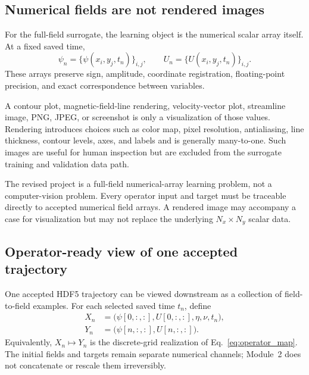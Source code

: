 \documentclass[11pt]{article}
\begin{document}
\subsection{Numerical fields are not rendered images}

For the full-field surrogate, the learning object is the numerical scalar array itself. At a fixed saved time,
\begin{equation}
\psi_n=\{\psi(x_i,y_j,t_n)\}_{i,j},
\qquad
U_n=\{U(x_i,y_j,t_n)\}_{i,j}.
\end{equation}
These arrays preserve sign, amplitude, coordinate registration, floating-point precision, and exact correspondence between variables.

A contour plot, magnetic-field-line rendering, velocity-vector plot, streamline image, PNG, JPEG, or screenshot is only a visualization of those values. Rendering introduces choices such as color map, pixel resolution, antialiasing, line thickness, contour levels, axes, and labels and is generally many-to-one. Such images are useful for human inspection but are excluded from the surrogate training and validation data path.

\begin{warningbox}
The revised project is a full-field numerical-array learning problem, not a computer-vision problem. Every operator input and target must be traceable directly to accepted numerical field arrays. A rendered image may accompany a case for visualization but may not replace the underlying $N_x\times N_y$ scalar data.
\end{warningbox}

\subsection{Operator-ready view of one accepted trajectory}

One accepted HDF5 trajectory can be viewed downstream as a collection of field-to-field examples. For each selected saved time $t_n$, define
\begin{align}
X_n&=\bigl(\psi[0,:,:],U[0,:,:],\eta,\nu,t_n\bigr),\\
Y_n&=\bigl(\psi[n,:,:],U[n,:,:]\bigr).
\end{align}
Equivalently, $X_n\mapsto Y_n$ is the discrete-grid realization of Eq.~\eqref{eq:operator_map}. The initial fields and targets remain separate numerical channels; Module~2 does not concatenate or rescale them irreversibly.
\end{document}
